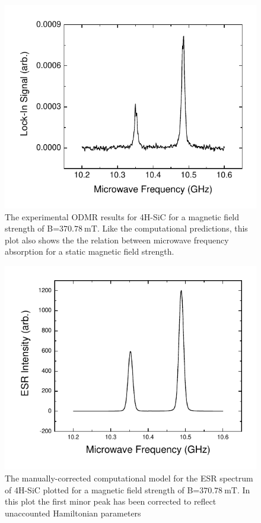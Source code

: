 \documentclass[oneside]{BYUPhys}
\begin{document}
\begin{figure}[H]
    \centerline{\includegraphics{p14-odmr}}
    \caption[Experimental ODMR for SiC]{\label{fig:SiCResults}
     The experimental ODMR results for 4H-SiC for a magnetic field strength of B=$370.78~\text{mT}$. Like the computational predictions, this plot also shows the the relation between microwave frequency absorption for a static magnetic field strength.}
 \end{figure}
 
\begin{figure}[H]
    \centerline{\includegraphics{p14-esr}}
    \caption[ESR Computational Model for SiC]{\label{fig:SiCModelCorrected}
     The manually-corrected computational model for the ESR spectrum of 4H-SiC plotted for a magnetic field strength of B=$370.78~\text{mT}$. In this plot the first minor peak has been corrected to reflect unaccounted Hamiltonian parameters}
 \end{figure}
\end{document}
